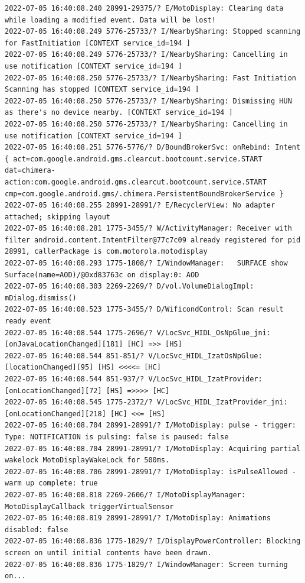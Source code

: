 \documentclass[a4paper,12pt]{book}
\begin{document}
\begin{lstlisting}
2022-07-05 16:40:08.240 28991-29375/? E/MotoDisplay: Clearing data while loading a modified event. Data will be lost!
2022-07-05 16:40:08.249 5776-25733/? I/NearbySharing: Stopped scanning for FastInitiation [CONTEXT service_id=194 ]
2022-07-05 16:40:08.249 5776-25733/? I/NearbySharing: Cancelling in use notification [CONTEXT service_id=194 ]
2022-07-05 16:40:08.250 5776-25733/? I/NearbySharing: Fast Initiation Scanning has stopped [CONTEXT service_id=194 ]
2022-07-05 16:40:08.250 5776-25733/? I/NearbySharing: Dismissing HUN as there's no device nearby. [CONTEXT service_id=194 ]
2022-07-05 16:40:08.250 5776-25733/? I/NearbySharing: Cancelling in use notification [CONTEXT service_id=194 ]
2022-07-05 16:40:08.251 5776-5776/? D/BoundBrokerSvc: onRebind: Intent { act=com.google.android.gms.clearcut.bootcount.service.START dat=chimera-action:com.google.android.gms.clearcut.bootcount.service.START cmp=com.google.android.gms/.chimera.PersistentBoundBrokerService }
2022-07-05 16:40:08.255 28991-28991/? E/RecyclerView: No adapter attached; skipping layout
2022-07-05 16:40:08.281 1775-3455/? W/ActivityManager: Receiver with filter android.content.IntentFilter@77c7c09 already registered for pid 28991, callerPackage is com.motorola.motodisplay
2022-07-05 16:40:08.293 1775-1808/? I/WindowManager:   SURFACE show Surface(name=AOD)/@0xd83763c on display:0: AOD
2022-07-05 16:40:08.303 2269-2269/? D/vol.VolumeDialogImpl: mDialog.dismiss()
2022-07-05 16:40:08.523 1775-3455/? D/WificondControl: Scan result ready event
2022-07-05 16:40:08.544 1775-2696/? V/LocSvc_HIDL_OsNpGlue_jni: [onJavaLocationChanged][181] [HC] =>> [HS]
2022-07-05 16:40:08.544 851-851/? V/LocSvc_HIDL_IzatOsNpGlue: [locationChanged][95] [HS] <<<<= [HC]
2022-07-05 16:40:08.544 851-937/? V/LocSvc_HIDL_IzatProvider: [onLocationChanged][72] [HS] =>>>> [HC]
2022-07-05 16:40:08.545 1775-2372/? V/LocSvc_HIDL_IzatProvider_jni: [onLocationChanged][218] [HC] <<= [HS]
2022-07-05 16:40:08.704 28991-28991/? I/MotoDisplay: pulse - trigger: Type: NOTIFICATION is pulsing: false is paused: false
2022-07-05 16:40:08.704 28991-28991/? I/MotoDisplay: Acquiring partial wakelock MotoDisplayWakeLock for 500ms.
2022-07-05 16:40:08.706 28991-28991/? I/MotoDisplay: isPulseAllowed - warm up complete: true
2022-07-05 16:40:08.818 2269-2606/? I/MotoDisplayManager: MotoDisplayCallback triggerVirtualSensor
2022-07-05 16:40:08.819 28991-28991/? I/MotoDisplay: Animations disabled: false
2022-07-05 16:40:08.836 1775-1829/? I/DisplayPowerController: Blocking screen on until initial contents have been drawn.
2022-07-05 16:40:08.836 1775-1829/? I/WindowManager: Screen turning on...

\end{lstlisting}
\end{document}
